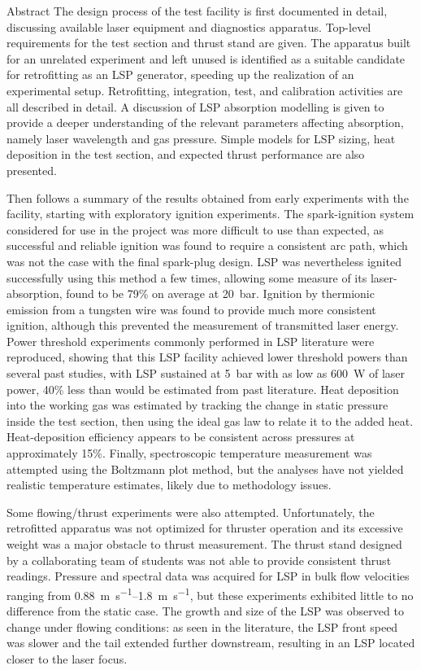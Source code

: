 \begin{plainchp}{Abstract}
    The design process of the test facility is first documented in detail, discussing available laser equipment and diagnostics apparatus. Top-level requirements for the test section and thrust stand are given. The apparatus built for an unrelated experiment and left unused is identified as a suitable candidate for retrofitting as an LSP generator, speeding up the realization of an experimental setup. Retrofitting, integration, test, and calibration activities are all described in detail. A discussion of LSP absorption modelling is given to provide a deeper understanding of the relevant parameters affecting absorption, namely laser wavelength and gas pressure. Simple models for LSP sizing, heat deposition in the test section, and expected thrust performance are also presented.

    Then follows a summary of the results obtained from early experiments with the facility, starting with exploratory ignition experiments. The spark-ignition system considered for use in the project was more difficult to use than expected, as successful and reliable ignition was found to require a consistent arc path, which was not the case with the final spark-plug design. LSP was nevertheless ignited successfully using this method a few times, allowing some measure of its laser-absorption, found to be 79\% on average at \qty{20}{bar}. Ignition by thermionic emission from a tungsten wire was found to provide much more consistent ignition, although this prevented the measurement of transmitted laser energy. Power threshold experiments commonly performed in LSP literature were reproduced, showing that this LSP facility achieved lower threshold powers than several past studies, with LSP sustained at \qty{5}{bar} with as low as \qty{600}{W} of laser power, 40\% less than would be estimated from past literature. Heat deposition into the working gas was estimated by tracking the change in static pressure inside the test section, then using the ideal gas law to relate it to the added heat. Heat-deposition efficiency appears to be consistent across pressures at approximately 15\%. Finally, spectroscopic temperature measurement was attempted using the Boltzmann plot method, but the analyses have not yielded realistic temperature estimates, likely due to methodology issues.

    Some flowing/thrust experiments were also attempted. Unfortunately, the retrofitted apparatus was not optimized for thruster operation and its excessive weight was a major obstacle to thrust measurement. The thrust stand designed by a collaborating team of students was not able to provide consistent thrust readings. Pressure and spectral data was acquired for LSP in bulk flow velocities ranging from \qtyrange{0.88}{1.8}{m.s^{-1}}, but these experiments exhibited little to no difference from the static case. The growth and size of the LSP was observed to change under flowing conditions: as seen in the literature, the LSP front speed was slower and the tail extended further downstream, resulting in an LSP located closer to the laser focus.


\end{plainchp}
